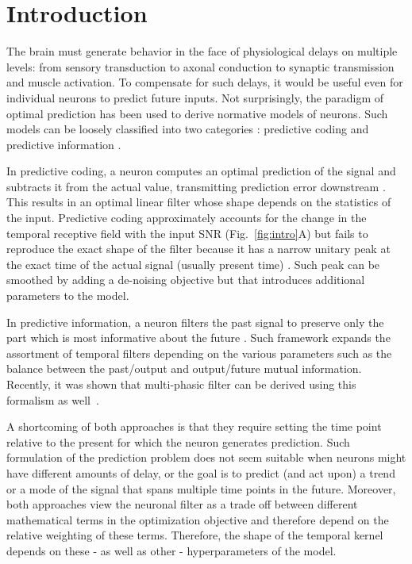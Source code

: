 \documentclass[%
 reprint,
 amsmath,amssymb,
 aps,
]{revtex4-2}
\begin{document}
 
\section{Introduction}

The brain must generate behavior in the face of physiological delays on multiple levels: from sensory transduction to axonal conduction to synaptic transmission and muscle activation. To compensate for such delays, it would be useful even for individual neurons to predict future inputs. Not surprisingly, the paradigm of optimal prediction has been used to derive normative models of neurons. Such models can be loosely classified into two categories \citep{singer2018sensory,chalk2018toward}: predictive coding \citep{srinivasan1982predictive,rao1999predictive,huang2011predictive, gregor2012lattice} and predictive information \citep{tishby2000information,bialek2006efficient}. 

In predictive coding, a neuron computes an optimal prediction of the signal and subtracts it from the actual value, transmitting prediction error downstream \citep{srinivasan1982predictive,rao1999predictive,huang2011predictive}. This results in an optimal linear filter whose shape depends on the statistics of the input. Predictive coding approximately accounts for the change in the temporal receptive field with the input SNR (Fig.~\ref{fig:intro}A) but fails to reproduce the exact shape of the filter because it has a narrow unitary peak at the exact time of the actual signal (usually present time) \citep{srinivasan1982predictive}. Such peak can be smoothed by adding a de-noising objective but that introduces additional parameters to the model. 

In predictive information, a neuron filters the past signal to preserve only the part which is most informative about the future \citep{tishby2000information,bialek2006efficient,chalk2018toward}. Such framework expands the assortment of temporal filters depending on the various parameters such as the balance between the past/output and output/future mutual information. Recently, it was shown that multi-phasic filter can be derived using this formalism as well~\cite{retinal-mosaics}.

A shortcoming of both approaches is that they require setting the time point relative to the present for which the neuron generates prediction. Such formulation of the prediction problem does not seem suitable when neurons might have different amounts of delay, or the goal is to predict (and act upon) a trend or a mode of the signal that spans multiple time points in the future. 
Moreover, both approaches view the neuronal filter as a trade off between different mathematical terms in the optimization objective and therefore depend on the relative weighting of these terms. Therefore, the shape of the temporal kernel depends on these - as well as other - hyperparameters of the model.
\end{document}
